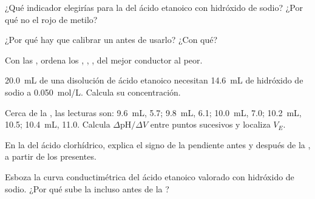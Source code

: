\begin{exercise}[$\star$]\label{exo:g12:ph-conductivity-titrations:3}
¿Qué indicador elegirías para la  del ácido etanoico con
hidróxido de sodio? ¿Por qué no el rojo de metilo?
\end{exercise}

\begin{exercise}[$\star$]\label{exo:g12:ph-conductivity-titrations:4}
¿Por qué hay que calibrar un  antes de usarlo? ¿Con qué?
\end{exercise}

\begin{exercise}[$\star$]\label{exo:g12:ph-conductivity-titrations:5}
Con las , ordena los  ,
, ,  del mejor conductor al peor.
\end{exercise}

\begin{exercise}[$\star\star$]\label{exo:g12:ph-conductivity-titrations:6}
\qty{20.0}{mL} de una disolución de ácido etanoico necesitan
\qty{14.6}{mL} de hidróxido de sodio a \qty{0.050}{mol/L}. Calcula su
concentración.
\end{exercise}

\begin{exercise}[$\star\star$]\label{exo:g12:ph-conductivity-titrations:7}
Cerca de la , las lecturas son: \qty{9.6}{mL},  5.7;
\qty{9.8}{mL}, 6.1; \qty{10.0}{mL}, 7.0; \qty{10.2}{mL}, 10.5;
\qty{10.4}{mL}, 11.0. Calcula $\Delta\mathrm{pH}/\Delta V$ entre puntos
sucesivos y localiza $V_E$.
\end{exercise}

\begin{exercise}[$\star\star$]\label{exo:g12:ph-conductivity-titrations:8}
En la  del ácido clorhídrico, explica el signo
de la pendiente antes y después de la , a partir de los 
presentes.
\end{exercise}

\begin{exercise}[$\star\star$]\label{exo:g12:ph-conductivity-titrations:9}
Esboza la curva conductimétrica del ácido etanoico valorado con
hidróxido de sodio. ¿Por qué sube la  incluso antes de la
?
\end{exercise}

